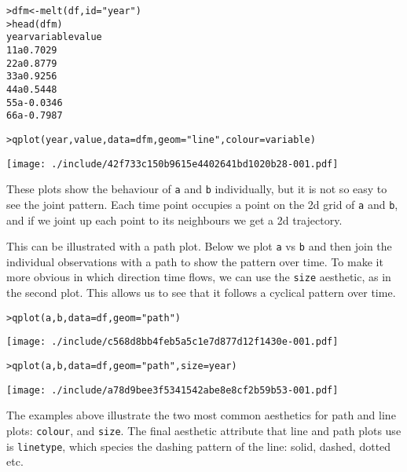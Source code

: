\begin{alltt}
> dfm <- melt(df, id = "year")
> head(dfm)
  year variable   value
1    1        a  0.7029
2    2        a  0.8779
3    3        a  0.9256
4    4        a  0.5448
5    5        a -0.0346
6    6        a -0.7987

> qplot(year, value, data = dfm, geom = "line", colour = variable)
\end{alltt}
\texttt{[image: ./include/42f733c150b9615e4402641bd1020b28-001.pdf]}
\begin{alltt}

\end{alltt}

These plots show the behaviour of {\tt a} and {\tt b} individually, but it is not so easy to see the joint pattern.  Each time point occupies a point on the 2d grid of {\tt a} and {\tt b}, and if we joint up each point to its neighbours we get a 2d trajectory.

This can be illustrated with a path plot.  Below we plot {\tt a} vs {\tt b} and then join the individual observations with a path to show the pattern over time.  To make it more obvious in which direction time flows, we can use the {\tt size} aesthetic, as in the second plot.   This allows us to see that it follows a cyclical pattern over time.

\begin{alltt}
> qplot(a, b, data = df, geom = "path")
\end{alltt}
\texttt{[image: ./include/c568d8bb4feb5a5c1e7d877d12f1430e-001.pdf]}
\begin{alltt}

> qplot(a, b, data = df, geom = "path", size = year)
\end{alltt}
\texttt{[image: ./include/a78d9bee3f5341542abe8e8cf2b59b53-001.pdf]}
\begin{alltt}

\end{alltt}

The examples above illustrate the two most common aesthetics for path and line plots: {\tt colour}, and {\tt size}.  The final aesthetic attribute that line and path plots use is {\tt linetype}, which species the dashing pattern of the line: solid, dashed, dotted etc.

